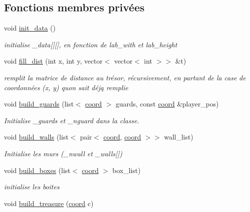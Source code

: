 \subsection*{Fonctions membres privées}
\begin{DoxyCompactItemize}
\item 
void \hyperlink{classLabyrinthe_afc3f86c4ce00a37bd2b033d1e343c7c5}{init\+\_\+data} ()
\begin{DoxyCompactList}\small\item\em initialise \+\_\+data\mbox{[}\mbox{]}\mbox{[}\mbox{]}, en fonction de lab\+\_\+with et lab\+\_\+height \end{DoxyCompactList}\item 
void \hyperlink{classLabyrinthe_aa420cdcee7e54812b8faa5b27f317955}{fill\+\_\+dist} (int x, int y, vector$<$ vector$<$ int $>$$>$ \&t)
\begin{DoxyCompactList}\small\item\em remplit la matrice de distance au trésor, récursivement, en partant de la case de coordonnées (x, y) qu\textquotesingle{}on sait déją remplie \end{DoxyCompactList}\item 
void \hyperlink{classLabyrinthe_a3fc2a0b2bbf0d1101fd7a3804bda9584}{build\+\_\+guards} (list$<$ \hyperlink{structcoord}{coord} $>$ guards, const \hyperlink{structcoord}{coord} \&player\+\_\+pos)
\begin{DoxyCompactList}\small\item\em Initialise \+\_\+guards et \+\_\+nguard dans la classe. \end{DoxyCompactList}\item 
void \hyperlink{classLabyrinthe_a2694b6ca24a8bba34f590d645245ff7e}{build\+\_\+walls} (list$<$ pair$<$ \hyperlink{structcoord}{coord}, \hyperlink{structcoord}{coord} $>$$>$ wall\+\_\+list)
\begin{DoxyCompactList}\small\item\em Initialise les murs (\+\_\+nwall et \+\_\+walls\mbox{[}\mbox{]}) \end{DoxyCompactList}\item 
void \hyperlink{classLabyrinthe_a69718b426a9402cd578b2174d3b9389b}{build\+\_\+boxes} (list$<$ \hyperlink{structcoord}{coord} $>$ box\+\_\+list)
\begin{DoxyCompactList}\small\item\em initialise les boites \end{DoxyCompactList}\item 
void \hyperlink{classLabyrinthe_a2e30105a06c0512ea2078f825fae17bd}{build\+\_\+treasure} (\hyperlink{structcoord}{coord} c)

\end{DoxyCompactItemize}
